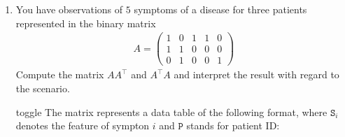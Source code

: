 \documentclass[letterpaper,10pt,english]{jupyterBook}
\begin{document}
\begin{enumerate}
\begin{sphinxuseclass}{toggle}
\begin{align*}
&=
\begin{pmatrix}1\cdot 0 &  1\cdot 2\\0\cdot 0 & 0\cdot 2\end{pmatrix} +
\begin{pmatrix}2\cdot 3 & 2\cdot 1 \\2\cdot 3 & 2\cdot 1\end{pmatrix} +
\begin{pmatrix}0\cdot 1&0\cdot2 \\4\cdot1&4\cdot2\end{pmatrix}\\
&=
\begin{pmatrix}0 &  2\\0 & 0\end{pmatrix} +
\begin{pmatrix}6 & 2 \\6 & 2\end{pmatrix} +
\begin{pmatrix}0&0 \\4&8\end{pmatrix}\\
&= \begin{pmatrix}6&4\\ 10 &10\end{pmatrix}
\end{align*}
\end{sphinxuseclass}
\item {} 
\sphinxAtStartPar
You have observations of \(5\) symptoms of a disease for three patients represented in the binary matrix
\begin{equation*}
\begin{split} A = \begin{pmatrix}
1 & 0 & 1 & 1 & 0\\
1 & 1 & 0 & 0 & 0\\
0 & 1 & 0 & 0 & 1\end{pmatrix}\end{split}
\end{equation*}
Compute the matrix \(AA^\top\) and \(A^\top A\) and interpret the result with regard to the scenario.

\begin{sphinxuseclass}{toggle}
\sphinxAtStartPar
The matrix represents a data table of the following format, where \(\mathtt{S}_i\) denotes the feature of sympton \(i\) and \(\mathtt{P}\) stands for patient ID:



\end{sphinxuseclass}
\end{enumerate}
\end{document}
